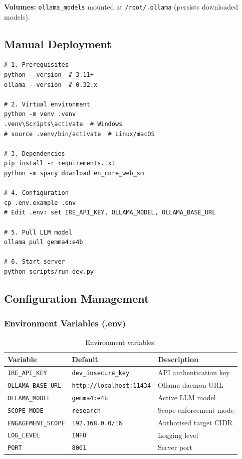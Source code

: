 ﻿\documentclass[10pt,journal,onecolumn]{IEEEtran}
\begin{document}
\noindent\textbf{Volumes:} \texttt{ollama\_models} mounted at \texttt{/root/.ollama} (persists downloaded models).

\subsection{Manual Deployment}
\begin{lstlisting}
# 1. Prerequisites
python --version  # 3.11+
ollama --version  # 0.32.x

# 2. Virtual environment
python -m venv .venv
.venv\Scripts\activate  # Windows
# source .venv/bin/activate  # Linux/macOS

# 3. Dependencies
pip install -r requirements.txt
python -m spacy download en_core_web_sm

# 4. Configuration
cp .env.example .env
# Edit .env: set IRE_API_KEY, OLLAMA_MODEL, OLLAMA_BASE_URL

# 5. Pull LLM model
ollama pull gemma4:e4b

# 6. Start server
python scripts/run_dev.py
\end{lstlisting}

\subsection{Configuration Management}

\subsubsection{Environment Variables (.env)}
\begin{table}[t]
\caption{Environment variables.}
\label{tab:envvars}
\begin{tabularx}{\textwidth}{>{\ttfamily}l >{\ttfamily}l X}
\toprule
\textbf{Variable} & \textbf{Default} & \textbf{Description}\\
\midrule
\texttt{IRE\_API\_KEY} & \texttt{dev\_insecure\_key} & API authentication key\\
\texttt{OLLAMA\_BASE\_URL} & \texttt{http://localhost:11434} & Ollama daemon URL\\
\texttt{OLLAMA\_MODEL} & \texttt{gemma4:e4b} & Active LLM model\\
\texttt{SCOPE\_MODE} & \texttt{research} & Scope enforcement mode\\
\texttt{ENGAGEMENT\_SCOPE} & \texttt{192.168.0.0/16} & Authorised target CIDR\\
\texttt{LOG\_LEVEL} & \texttt{INFO} & Logging level\\
\texttt{PORT} & \texttt{8001} & Server port\\
\bottomrule
\end{tabularx}
\end{table}
\end{document}
